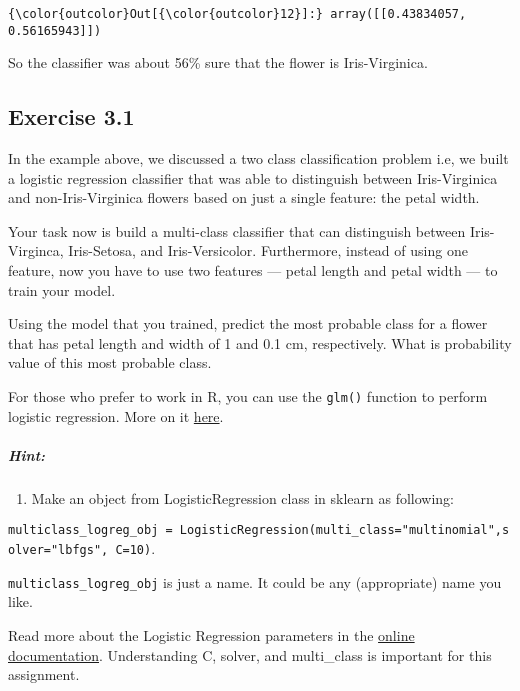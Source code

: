 \documentclass[11pt]{article}
\providecommand{\tightlist}{%
      \setlength{\itemsep}{0pt}\setlength{\parskip}{0pt}}
\begin{document}
\begin{Verbatim}[commandchars=\\\{\}]
{\color{outcolor}Out[{\color{outcolor}12}]:} array([[0.43834057, 0.56165943]])
\end{Verbatim}
            
    So the classifier was about 56\% sure that the flower is Iris-Virginica.

    \hypertarget{exercise-3.1}{%
\subsection{Exercise 3.1}\label{exercise-3.1}}

In the example above, we discussed a two class classification problem
i.e, we built a logistic regression classifier that was able to
distinguish between Iris-Virginica and non-Iris-Virginica flowers based
on just a single feature: the petal width.

Your task now is build a multi-class classifier that can distinguish
between Iris-Virginca, Iris-Setosa, and Iris-Versicolor. Furthermore,
instead of using one feature, now you have to use two features --- petal
length and petal width --- to train your model.

Using the model that you trained, predict the most probable class for a
flower that has petal length and width of 1 and 0.1 cm, respectively.
What is probability value of this most probable class.

For those who prefer to work in R, you can use the \texttt{glm()}
function to perform logistic regression. More on it
\href{https://www.datacamp.com/community/tutorials/logistic-regression-R}{here}.

\hypertarget{hint}{%
\subparagraph{Hint:}\label{hint}}

\begin{enumerate}
\def\labelenumi{\arabic{enumi}.}
\tightlist
\item
  Make an object from LogisticRegression class in sklearn as following:
\end{enumerate}

\texttt{multiclass\_logreg\_obj\ =\ LogisticRegression(multi\_class="multinomial",solver="lbfgs",\ C=10)}.

\texttt{multiclass\_logreg\_obj} is just a name. It could be any
(appropriate) name you like.

Read more about the Logistic Regression parameters in the
\href{http://scikit-learn.org/stable/modules/generated/sklearn.linear_model.LogisticRegression.html}{online
documentation}. Understanding C, solver, and multi\_class is important
for this assignment.
\end{document}
